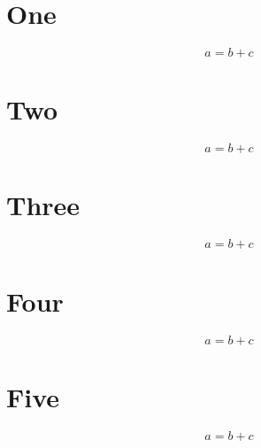 \documentclass{article}
\begin{document}
\section{One}
\begin{equation} a=b+c\end{equation}

\section{Two}
\begin{equation} a=b+c\end{equation}

\section{Three}
\begin{equation} a=b+c\end{equation}


\section{Four}
\begin{equation} a=b+c\end{equation}

\section{Five}
\begin{equation} a=b+c\end{equation}
\end{document}

